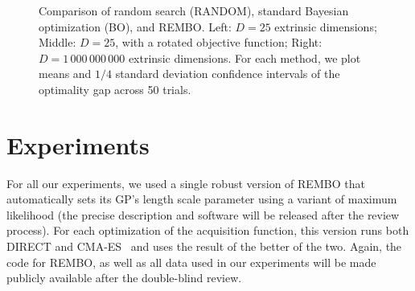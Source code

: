 \documentclass{article}
\begin{document}
\begin{figure}[t!]
  \caption{Comparison of random search (RANDOM), standard Bayesian optimization (BO), and REMBO.
Left: $D=25$ extrinsic dimensions; Middle: $D=25$, with a rotated objective function; Right: $D=1\,000\,000\,000$ extrinsic dimensions. For each method, we plot means and $1/4$ standard deviation confidence intervals of the optimality gap across 50 trials.}
  \label{fig:standard}
  \vspace{-1.0em}
\end{figure}





\section{Experiments}\label{sec:experiments}


%

For all our experiments, we used a single robust version of REMBO that automatically sets its GP's length scale parameter using a variant of maximum likelihood (the precise description and software will be released after the review process). For each optimization of the acquisition function, this version runs both DIRECT \cite{Jones:1993} and CMA-ES~\cite{Hansen:2001:CDS:1108839.1108843} and uses the result of the better of the two.
Again, the code for REMBO, as well as all data used in our experiments will be made publicly available after the double-blind review.

%
% 
%
%
\end{document}
